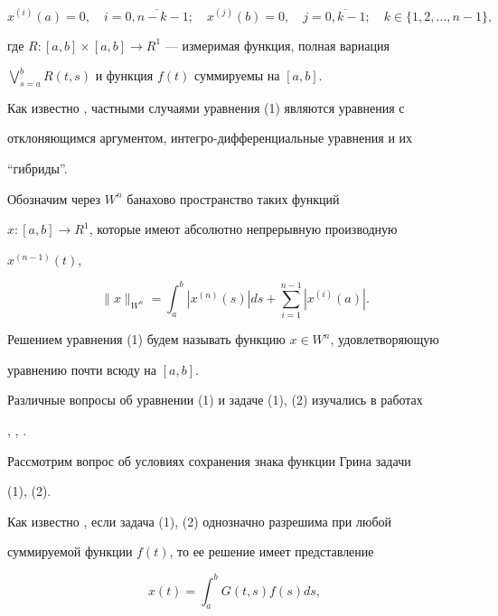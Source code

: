 \begin{equation} 


x^{(i)}(a)=0,\quad i=\overline{0,n-k-1};\quad x^{(j)}(b)=0, 


\quad j=\overline{0,k-1};\quad k\in\{1,2,\dotsc,n-1\}, 


\end{equation} 


где $R:[a,b]\times[a,b]\to R^1$ --- измеримая функция, полная вариация 


$\bigvee^b_{s=a}R(t,s)$ и функция $f(t)$ суммируемы на $[a,b]$. 


 


Как известно \cite{Az1}, частными случаями уравнения (1) являются уравнения с 


отклоняющимся аргументом, интегро-дифференциальные уравнения и их 


``гибриды''. 


 


Обозначим через $W^n$ банахово пространство таких функций 


$x:[a,b]\to R^1$, которые имеют абсолютно непрерывную производную 


$x^{(n-1)}(t)$, 


$$ 


\|x\|_{W^n}=\int^b_a |x^{(n)}(s)|ds+\sum^{n-1}_{i=1}|x^{(i)}(a)|. 


$$ 


Решением уравнения (1) будем называть функцию $x\in W^n$, удовлетворяющую 


уравнению почти всюду на $[a,b]$. 


 


Различные вопросы об уравнении (1) и задаче (1), (2) изучались в работах 


\cite{Pla}, \cite{Sch1}, \cite{Sch2}.


Рассмотрим вопрос об условиях сохранения знака функции Грина задачи 


(1), (2). 


 


Как известно \cite{Az1}, если задача (1), (2) однозначно разрешима при любой 


суммируемой функции $f(t)$, то ее решение имеет представление 


\begin{equation} 


x(t)=\int^b_a G(t,s)f(s)ds, 


\end{equation} 


